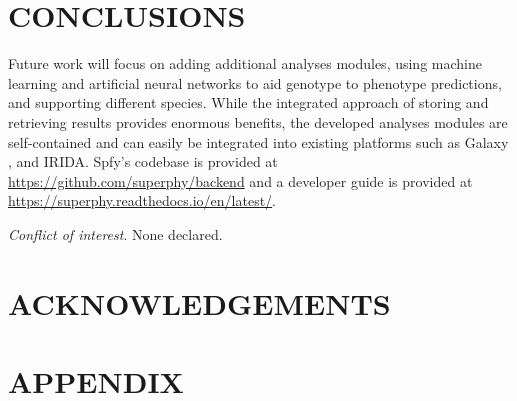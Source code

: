 \documentclass{article}
\begin{document}
\section{CONCLUSIONS}

Future work will focus on adding additional analyses modules, using machine learning and artificial neural networks to aid genotype to phenotype predictions, and supporting different species. While the integrated approach of storing and retrieving results provides enormous benefits, the developed analyses modules are self-contained and can easily be integrated into existing platforms such as Galaxy \cite{goecks2010galaxy}, and IRIDA. Spfy's codebase is provided at \url{https://github.com/superphy/backend} and a developer guide is provided at \url{https://superphy.readthedocs.io/en/latest/}.

\textit{Conflict of interest}. None declared.

\section{ACKNOWLEDGEMENTS}

\newpage




\newpage

\section{APPENDIX}
\end{document}
